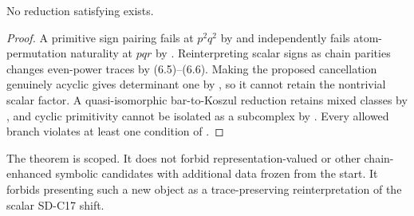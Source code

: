\begin{theorem}
\label{thm:no-lift}
No reduction satisfying  exists.
\end{theorem}

\begin{proof}
A primitive sign pairing fails at $p^2q^2$ by
 and independently fails atom-permutation
naturality at $pqr$ by .  Reinterpreting scalar signs as chain
parities changes even-power traces by (6.5)--(6.6).  Making the proposed
cancellation genuinely acyclic gives determinant one by ,
so it cannot retain the nontrivial scalar factor.  A quasi-isomorphic
bar-to-Koszul reduction retains mixed classes by , and cyclic
primitivity cannot be isolated as a subcomplex by
.  Every allowed branch violates at least one
condition of .
\end{proof}

The theorem is scoped.  It does not forbid representation-valued or other
chain-enhanced symbolic candidates with additional data frozen from the
start.  It forbids presenting such a new object as a trace-preserving
reinterpretation of the scalar SD-C17 shift.
